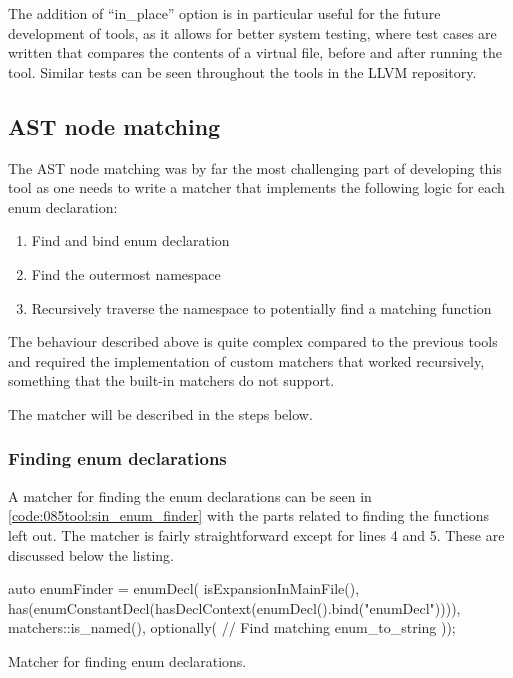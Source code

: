 The addition of ``in\_place'' option is in particular useful for the future development of tools, as it allows for better system testing, where test cases are written that compares the contents of a virtual file, before and after running the tool.
Similar tests can be seen throughout the tools in the LLVM repository.

\subsection{AST node matching}\label{subsec:085tool:enum_node_matching_sin}

The AST node matching was by far the most challenging part of developing this tool as one needs to write a matcher that implements the following logic for each enum declaration:

\vspace*{-0.75em}
\begin{enumerate}
    \item Find and bind enum declaration
    \item Find the outermost namespace
    \item Recursively traverse the namespace to potentially find a matching  function
\end{enumerate}

The behaviour described above is quite complex compared to the previous tools and required the implementation of custom matchers that worked recursively, something that the built-in matchers do not support.

The matcher will be described in the steps below.

\subsubsection*{Finding enum declarations}
A matcher for finding the enum declarations can be seen in \cref{code:085tool:sin_enum_finder} with the parts related to finding the  functions left out.
The matcher is fairly straightforward except for lines 4 and 5. These are discussed below the listing.

\begin{listing}[H]
    \begin{cppcode}
auto enumFinder = enumDecl(
        isExpansionInMainFile(),
        has(enumConstantDecl(hasDeclContext(enumDecl().bind("enumDecl")))),
        matchers::is_named(),
        optionally(
            // Find matching enum_to_string
        ));
    \end{cppcode}
    \caption{Matcher for finding enum declarations.}
    \label{code:085tool:sin_enum_finder}
\end{listing}

